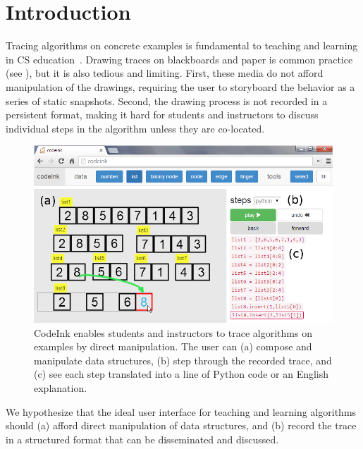 \section{Introduction}

Tracing algorithms on concrete examples is fundamental to teaching and learning
in CS education~\cite{Lister2004}. Drawing traces on blackboards and paper is
common practice (see ), but it is also tedious and limiting. First, these media do not afford manipulation of the
drawings, requiring the user to storyboard the behavior as a series of static
snapshots. Second, the drawing process is not recorded in a persistent format,
making it hard for students and instructors to discuss individual steps in
the algorithm unless they are co-located.


\begin{figure}

\begin{center}
\includegraphics[width=\columnwidth]{img/frontpage-mergesort.png}
\end{center}

\caption{CodeInk enables students and instructors to trace algorithms on
examples by direct manipulation. The user can (a) compose and manipulate
data structures, (b) step through the recorded trace, and (c) see each
step translated into a line of Python code or an English explanation.}

\label{fig:codeink-intro}
\end{figure}


We hypothesize that the ideal user interface for teaching and learning
algorithms should (a) afford direct manipulation of data structures, and (b)
record the trace in a structured format that can be disseminated and discussed.

